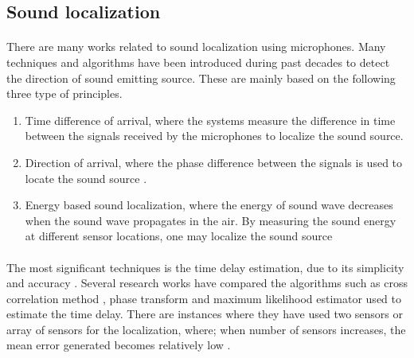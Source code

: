 \documentclass[12pt]{article}
\numberwithin{figure}{section}
\numberwithin{table}{section}
\begin{document}
\subsection{Sound localization}
\paragraph{}
There are many works related to sound localization using microphones. Many techniques and algorithms have been introduced during past decades to detect the direction of sound emitting source. These are mainly based on the following three type of principles.
\begin{enumerate}
\item Time difference of arrival, where the systems measure the difference in time between the signals received by the microphones to localize the sound source.
\item Direction of arrival, where the phase difference between the signals is used to locate the sound source \cite {20}.
\item Energy based sound localization, where the energy of sound wave decreases when the sound wave propagates in the air. By measuring the sound energy at different sensor locations, one may localize the sound source \cite {21}
\end{enumerate}

\paragraph{}
The most significant techniques is the time delay estimation, due to its simplicity and accuracy \cite {22}. Several research works have compared the algorithms such as cross correlation method \cite {23}, phase transform \cite {24} and maximum likelihood estimator \cite {25} used to estimate the time delay. There are instances where they have used two sensors or array of sensors for the localization, where; when number of sensors increases, the mean error generated becomes relatively low \cite {26}.
\end{document}
